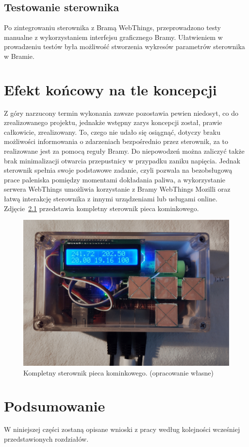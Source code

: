 \documentclass[11pt]{report}
\begin{document}
  \section{Testowanie sterownika}
 Po zintegrowaniu sterownika z Bramą WebThings, przeprowadzono testy manualne z wykorzystaniem interfejsu graficznego Bramy. Ułatwieniem w prowadzeniu testów była możliwość stworzenia wykresów parametrów sterownika w Bramie. 
 
 \chapter{Efekt końcowy na tle koncepcji}
 Z góry narzucony termin wykonania zawsze pozostawia pewien niedosyt, co do zrealizowanego projektu, jednakże wstępny zarys koncepcji został, prawie całkowicie, zrealizowany. To, czego nie udało się osiągnąć, dotyczy
 braku możliwości informowania o zdarzeniach bezpośrednio przez sterownik, za to realizowane jest za pomocą reguły Bramy. Do niepowodzeń można zaliczyć także brak minimalizacji otwarcia przepustnicy w przypadku zaniku napięcia.
 Jednak sterownik spełnia swoje podstawowe zadanie, czyli pozwala na bezobsługową prace paleniska pomiędzy momentami dokładania paliwa, a wykorzystanie serwera WebThings umożliwia korzystanie z Bramy WebThings Mozilli oraz łatwą interakcję sterownika z innymi urządzeniami lub usługami online.
    Zdjęcie~\ref{fig:sterownik} przedstawia kompletny sterownik pieca kominkowego.
\begin{figure}[ht]
\centering
\includegraphics[width=0.8 \textwidth]{fig/sterownik.jpg}
\caption{Kompletny sterownik pieca kominkowego. (opracowanie własne)}
\label{fig:sterownik}
\end{figure}
 
 
 \chapter{Podsumowanie}
W niniejszej części zostaną opisane wnioski z pracy według kolejności wcześniej przedstawionych rozdziałów.
\end{document}
